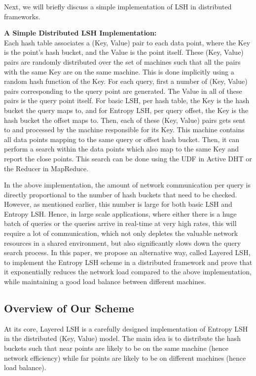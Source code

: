 \documentclass{acm_proc_article-sp}
\numberwithin{equation}{section}
\numberwithin{figure}{section}
\begin{document}
Next, we will briefly discuss a simple implementation of LSH in distributed frameworks. 

\noindent \textbf{A Simple Distributed LSH Implementation:} \\ 
Each hash table associates a (Key, Value) pair to each data point, where the Key is the point's hash bucket, and the Value is the point itself. These (Key, Value) pairs are randomly distributed over the set of machines such that all the pairs with the same Key are on the same machine. This is done implicitly using a random hash function of the Key. For each query, first a number of (Key, Value) pairs corresponding to the query point are generated. The Value in all of these pairs is the query point itself. For basic LSH, per hash table, the Key is the hash bucket the query maps to, and for Entropy LSH, per query offset, the Key is the hash bucket the offset maps to. Then, each of these (Key, Value) pairs gets sent to and processed by the machine responsible for its Key. This machine contains all data points mapping to the same query or offset hash bucket. Then, it can perform a search within the data points which also map to the same Key and report the close points. This search can be done using the UDF in Active DHT or the Reducer in MapReduce.

In the above implementation, the amount of network communication per query is directly proportional to the number of hash buckets that need to be checked. However, as mentioned earlier, this number is large for both basic LSH and Entropy LSH. Hence, in large scale applications, where either there is a huge batch of queries or the queries arrive in real-time at very high rates, this will require a lot of communication, which not only depletes the valuable network resources in a shared environment, but also significantly slows down the query search process. In this paper, we propose an alternative way, called Layered LSH, to implement the Entropy LSH scheme in a distributed framework and prove that it exponentially reduces the network load compared to the above implementation, while maintaining a good load balance between different machines.

\subsection{Overview of Our Scheme}
\label{sec:overview}

At its core, Layered LSH is a carefully designed implementation of Entropy LSH in the distributed (Key, Value) model. The main idea is to distribute the hash buckets such that near points are likely to be on the same machine (hence network efficiency) while far points are likely to be on different machines (hence load balance). 
\end{document}
